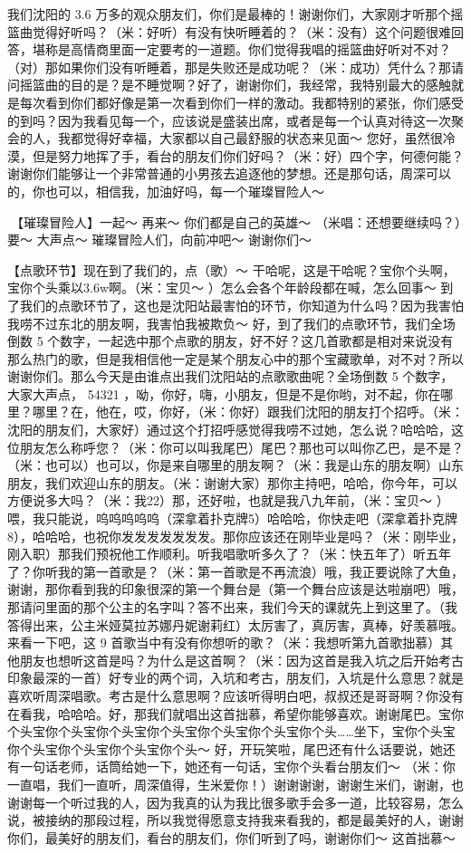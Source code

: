 \documentclass[
]{book}
\begin{document}
我们沈阳的 3.6 万多的观众朋友们，你们是最棒的！谢谢你们，大家刚才听那个摇篮曲觉得好听吗？（米：好听）有没有快听睡着的？（米：没有）这个问题很难回答，堪称是高情商里面一定要考的一道题。你们觉得我唱的摇篮曲好听对不对？（对）那如果你们没有听睡着，那是失败还是成功呢？（米：成功）凭什么？那请问摇篮曲的目的是？是不睡觉啊？好了，谢谢你们，我经常，我特别最大的感触就是每次看到你们都好像是第一次看到你们一样的激动。我都特别的紧张，你们感受的到吗？因为我看见每一个，应该说是盛装出席，或者是每一个认真对待这一次聚会的人，我都觉得好幸福，大家都以自己最舒服的状态来见面～
您好，虽然很冷漠，但是努力地挥了手，看台的朋友们你们好吗？（米：好）四个字，何德何能？谢谢你们能够让一个非常普通的小男孩去追逐他的梦想。还是那句话，周深可以的，你也可以，相信我，加油好吗，每一个璀璨冒险人～

🎵【璀璨冒险人】一起～ 再来～ 你们都是自己的英雄～ （米唱：还想要继续吗？）要～ 大声点～ 璀璨冒险人们，向前冲吧～ 谢谢你们～

【点歌环节】现在到了我们的，点（歌）～ 干哈呢，这是干哈呢？宝你个头啊，宝你个头乘以3.6w啊。（米：宝贝～ ）怎么会各个年龄段都在喊，怎么回事～ 到了我们的点歌环节了，这也是沈阳站最害怕的环节，你知道为什么吗？因为我害怕我唠不过东北的朋友啊，我害怕我被欺负～ 好，到了我们的点歌环节，我们全场倒数 5 个数字，一起选中那个点歌的朋友，好不好？这几首歌都是相对来说没有那么热门的歌，但是我相信他一定是某个朋友心中的那个宝藏歌单，对不对？所以谢谢你们。那么今天是由谁点出我们沈阳站的点歌歌曲呢？全场倒数 5 个数字，大家大声点， 54321 ，呦，你好，嗨，小朋友，但是不是你哟，对不起，你在哪里？哪里？在，他在，哎，你好，（米：你好）跟我们沈阳的朋友打个招呼。（米：沈阳的朋友们，大家好）通过这个打招呼感觉得我唠不过她，怎么说？哈哈哈，这位朋友怎么称呼您？（米：你可以叫我尾巴）尾巴？那也可以叫你乙巴，是不是？（米：也可以）也可以，你是来自哪里的朋友啊？（米：我是山东的朋友啊）山东朋友，我们欢迎山东的朋友。（米：谢谢大家）那你主持吧，哈哈，你今年，可以方便说多大吗？（米：我22）那，还好啦，也就是我八九年前，（米：宝贝～ ）喂，我只能说，呜呜呜呜呜（深拿着扑克牌5）哈哈哈，你快走吧（深拿着扑克牌8），哈哈哈，也祝你发发发发发发发。那你应该还在刚毕业是吗？（米：刚毕业，刚入职）那我们预祝他工作顺利。听我唱歌听多久了？（米：快五年了）听五年了？你听我的第一首歌是？（米：第一首歌是不再流浪）哦，我正要说除了大鱼，谢谢，那你看到我的印象很深的第一个舞台是（第一个舞台应该是达啦崩吧）哦，那请问里面的那个公主的名字叫？答不出来，我们今天的课就先上到这里了。（我答得出来，公主米娅莫拉苏娜丹妮谢莉红）太厉害了，真厉害，真棒，好羡慕哦。来看一下吧，这 9 首歌当中有没有你想听的歌？（米：我想听第九首歌拙慕）其他朋友也想听这首是吗？为什么是这首啊？（米：因为这首是我入坑之后开始考古印象最深的一首）好专业的两个词，入坑和考古，朋友们，入坑是什么意思？就是喜欢听周深唱歌。考古是什么意思啊？应该听得明白吧，叔叔还是哥哥啊？你没有在看我，哈哈哈。好，那我们就唱出这首拙慕，希望你能够喜欢。谢谢尾巴。宝你个头宝你个头宝你个头宝你个头宝你个头宝你个头宝你个头\ldots\ldots 坐下，宝你个头宝你个头宝你个头宝你个头宝你个头～ 好，开玩笑啦，尾巴还有什么话要说，她还有一句话老师，话筒给她一下，她还有一句话，宝你个头看台朋友们～ （米：你一直唱，我们一直听，周深值得，生米爱你！）谢谢谢谢，谢谢生米们，谢谢，也谢谢每一个听过我的人，因为我真的认为我比很多歌手会多一道，比较容易，怎么说，被接纳的那段过程，所以我觉得愿意支持我来看我的，都是最美好的人，谢谢你们，最美好的朋友们，看台的朋友们，你们听到了吗，谢谢你们～ 这首拙慕～
\end{document}
